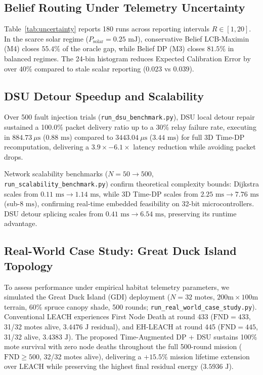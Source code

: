 \documentclass[journal]{IEEEtran}
\begin{document}
\subsection{Belief Routing Under Telemetry Uncertainty}
Table~\ref{tab:uncertainty} reports 180 runs across reporting intervals $R \in [1, 20]$. In the scarce solar regime ($P_{\text{solar}} = 0.25\text{ mJ}$), conservative Belief LCB-Maximin (M4) closes $55.4\%$ of the oracle gap, while Belief DP (M3) closes $81.5\%$ in balanced regimes. The 24-bin histogram reduces Expected Calibration Error by over $40\%$ compared to stale scalar reporting ($0.023$ vs $0.039$).

\subsection{DSU Detour Speedup and Scalability}
Over 500 fault injection trials (\texttt{run\_dsu\_benchmark.py}), DSU local detour repair sustained a 100.0\% packet delivery ratio up to a 30\% relay failure rate, executing in $884.73\ \mu\text{s}$ ($0.88\text{ ms}$) compared to $3443.04\ \mu\text{s}$ ($3.44\text{ ms}$) for full 3D Time-DP recomputation, delivering a $3.9\times - 6.1\times$ latency reduction while avoiding packet drops.

Network scalability benchmarks ($N = 50 \to 500$, \texttt{run\_scalability\_benchmark.py}) confirm theoretical complexity bounds: Dijkstra scales from $0.11\text{ ms} \to 1.14\text{ ms}$, while 3D Time-DP scales from $2.25\text{ ms} \to 7.76\text{ ms}$ (sub-$8\text{ ms}$), confirming real-time embedded feasibility on 32-bit microcontrollers. DSU detour splicing scales from $0.41\text{ ms} \to 6.54\text{ ms}$, preserving its runtime advantage.

\subsection{Real-World Case Study: Great Duck Island Topology}
To assess performance under empirical habitat telemetry parameters, we simulated the Great Duck Island (GDI) deployment ($N=32$ motes, $200\text{m} \times 100\text{m}$ terrain, 60\% spruce canopy shade, 500 rounds; \texttt{run\_real\_world\_case\_study.py}). Conventional LEACH experiences First Node Death at round 433 ($\text{FND}=433$, 31/32 motes alive, $3.4476\text{ J}$ residual), and EH-LEACH at round 445 ($\text{FND}=445$, 31/32 alive, $3.4383\text{ J}$). The proposed Time-Augmented DP + DSU sustains 100\% mote survival with zero node deaths throughout the full 500-round mission ($\text{FND} \ge 500$, 32/32 motes alive), delivering a $+15.5\%$ mission lifetime extension over LEACH while preserving the highest final residual energy ($3.5936\text{ J}$).
\end{document}
